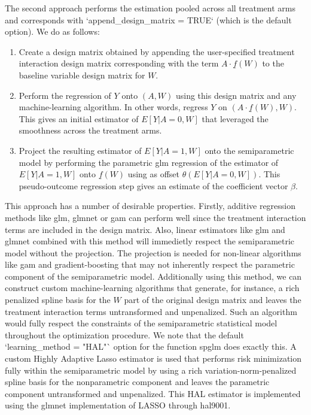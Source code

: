 \documentclass[article]{jss}
\begin{document}
The second approach performs the estimation pooled across all treatment arms and corresponds with `append\_design\_matrix = TRUE` (which is the default option). We do as follows:
\begin{enumerate}
\item Create a design matrix obtained by appending the user-specified treatment interaction design matrix corresponding with the term $A \cdot \underline{f}(W)$ to the baseline variable design matrix for $W$.
\item Perform the regression of $Y$ onto $(A,W)$ using this design matrix and any machine-learning algorithm. In other words, regress $Y$ on $(A \cdot \underline{f}(W), W)$. This gives an initial estimator of $E[Y|A=0,W]$ that leveraged the smoothness across the treatment arms.
\item Project the resulting estimator of $E[Y|A=1,W]$ onto the semiparametric model by performing the parametric glm regression of the estimator of $E[Y|A=1,W]$ onto $\underline{f}(W)$ using as offset $\theta(E[Y|A=0,W])$. This pseudo-outcome regression step gives an estimate of the coefficient vector $\beta$.

\end{enumerate}
This approach has a number of desirable properties. Firstly, additive regression methods like glm, glmnet or gam can perform well since the treatment interaction terms are included in the design matrix. Also, linear estimators like glm and glmnet combined with this method will immedietly respect the semiparametric model  without the projection. The projection is needed for non-linear algorithms like gam and gradient-boosting that may not inherently respect the parametric component of the semiparametric model. Additionally using this method, we can construct custom machine-learning algorithms that generate, for instance, a rich penalized spline basis for the $W$ part of the original design matrix and leaves the treatment interaction terms untransformed and unpenalized. Such an algorithm would fully respect the constraints of the semiparametric statistical model throughout the optimization procedure. We note that the default `learning\_method = "HAL"` option for the function spglm does exactly this. A custom Highly Adaptive Lasso estimator is used that performs risk minimization fully within the semiparametric model by using a rich variation-norm-penalized spline basis for the nonparametric component and leaves the parametric component untransformed and unpenalized. This HAL estimator is implemented using the glmnet implementation of LASSO through hal9001.
\end{document}
